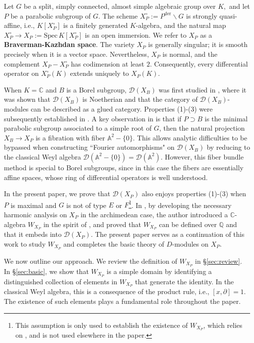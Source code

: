 \documentclass[11pt,a4paper,usenames,dvipsnames,reqno]{amsart}
\numberwithin{equation}{section}
\newcommand{\cc}{\mathbb C}
\newcommand{\qq}{\mathbb Q}
\newcommand{\A}{\mathbb A}
\theoremstyle{definition}
\theoremstyle{remark}
\begin{document}
Let $G$ be a split, simply connected, almost simple algebraic group over $K,$ and let $P$ be a parabolic subgroup of $G$. The scheme $X_P^\circ:=P^{\mathrm{der}}\backslash G$ is strongly quasi-affine, i.e., $K[X_P^\circ]$ is a finitely generated $K$-algebra, and the natural map $X_P^\circ\to X_P:=\mathrm{Spec}\, K[X_P^\circ]$ is an open immersion. We refer to $X_P$ as a \textbf{Braverman-Kazhdan space}. The variety $X_P$ is generally singular; it is smooth precisely when it is a vector space. Nevertheless, $X_P$ is normal, and the complement $X_P-X_P^\circ$ has codimension at least $2$. Consequently, every differential operator on $X_P^\circ(K)$ extends uniquely to $X_P(K)$. 

When $K=\cc$ and $B$ is a Borel subgroup, $\mathcal{D}(X_B)$ was first studied in \cite{BBP:Gluingbasicaffine}, where it was shown that $\mathcal{D}(X_B)$ is Noetherian and that the category of $\mathcal{D}(X_B)$-modules can be described as a glued category. Properties (1)-(3) were subsequently established in \cite{Stafford, GR:basic}. A key observation in \cite{BK:basicaffine, BBP:Gluingbasicaffine} is that if $P\supset B$ is the minimal parabolic subgroup associated to a simple root of $G$, then the natural projection $X_B\to X_{P}$ is a fibration with fiber $\A^2-\{0\}$. This allows analytic difficulties to be bypassed when constructing ``Fourier automorphisms"  on $\mathcal{D}(X_B)$ by  reducing to the classical Weyl algebra $\mathcal{D}(\A^2-\{0\})=\mathcal{D}(\A^2)$. However, this fiber bundle method is special to Borel subgroups, since in this case the fibers are essentially affine spaces, whose ring of differential operators is well understood.

In the present paper, we prove that $\mathcal{D}(X_P)$ also enjoys properties (1)-(3) when $P$ is maximal and $G$ is not of type $E$ or $F$\footnote{This assumption is only used to establish the existence of $W_{X_P}$, which relies on \cite{Hsu:asymptotics}, and is not used elsewhere in the paper.}. In \cite{Hsu:asymptotics}, by  developing the necessary harmonic analysis on $X_P$ in the archimedean case, the author introduced a $\cc$-algebra $W_{X_P}$ in the spirit of \cite{BBP:Gluingbasicaffine}, and proved that $W_{X_P}$ can be defined over $\qq$ and that it embeds into $\mathcal{D}(X_P).$ The present paper serves as a continuation of this work to study $W_{X_P}$ and completes the basic theory of $D$-modules on $X_P$.

We now outline our approach. We review the definition of $W_{X_P}$ in \S \ref{sec:review}. In \S \ref{sec:basic}, we show that $W_{X_P}$ is a simple domain by identifying a distinguished collection of elements in $W_{X_P}$ that generate the identity. In the classical Weyl algebra, this is a consequence of the product rule, i.e., $[x,\partial]=1$. The existence of such elements plays a fundamental role throughout the paper. 
\end{document}
